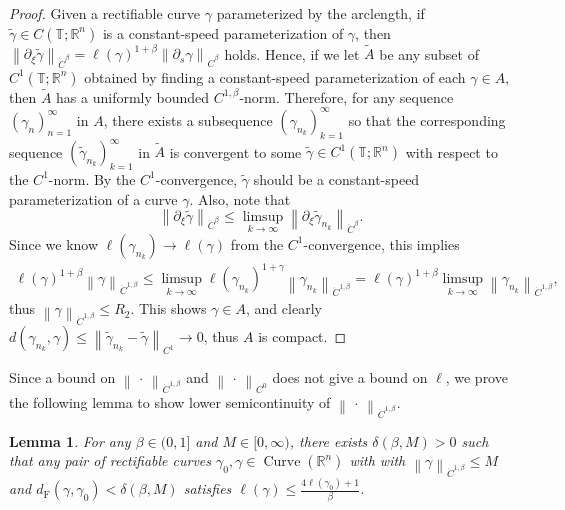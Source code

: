 \documentclass[reqno,centertags,12pt]{amsart}
\newtheorem{lemma}[theorem]{Lemma}
\theoremstyle{definition}
\numberwithin{equation}{section}
\newcommand{\norm}[1]{\left\|#1\right\|}
\newcommand{\seq}[1]{\left( #1 \right)}
\newcommand{\bbR}{{\mathbb{R}}}
\newcommand{\bbT}{{\mathbb{T}}}
\begin{document}
\begin{proof}
    Given a rectifiable curve $\gamma$ parameterized by the arclength,
    if $\tilde{\gamma}\in C(\bbT;\bbR^{n})$ is a constant-speed parameterization of $\gamma$,
    then $\norm{\partial_{\xi}\tilde{\gamma}}_{\dot{C}^{\beta}}
    = \ell(\gamma)^{1+\beta}\norm{\partial_{s}\gamma}_{\dot{C}^{\beta}}$ holds.
    Hence, if we let $\tilde{A}$ be any subset of $C^{1}(\bbT;\bbR^{n})$
    obtained by finding a constant-speed parameterization of each
    $\gamma\in A$, then $\tilde{A}$ has a uniformly bounded
    $C^{1,\beta}$-norm. Therefore, for any sequence
    $\seq{\gamma_{n}}_{n=1}^{\infty}$ in $A$, there exists a subsequence
    $\seq{\gamma_{n_{k}}}_{k=1}^{\infty}$ so that the corresponding sequence
    $\seq{\tilde{\gamma}_{n_{k}}}_{k=1}^{\infty}$ in $\tilde{A}$ is convergent
    to some $\tilde{\gamma}\in C^{1}(\bbT;\bbR^{n})$ with respect to the $C^{1}$-norm.
    By the $C^{1}$-convergence, $\tilde{\gamma}$ should be a constant-speed parameterization
    of a curve $\gamma$. Also, note that
    \[
        \norm{\partial_{\xi}\tilde{\gamma}}_{\dot{C}^{\beta}}
        \leq \limsup_{k\to\infty}\norm{\partial_{\xi}\tilde{\gamma}_{n_{k}}}_{\dot{C}^{\beta}}.
    \]
    Since we know $\ell(\gamma_{n_{k}}) \to \ell(\gamma)$ from the $C^{1}$-convergence,
    this implies
    \begin{align*}
        \ell(\gamma)^{1+\beta}\norm{\gamma}_{\dot{C}^{1,\beta}}
        \leq \limsup_{k\to\infty}\ell(\gamma_{n_{k}})^{1+\gamma}
        \norm{\gamma_{n_{k}}}_{\dot{C}^{1,\beta}}
        = \ell(\gamma)^{1+\beta}
        \limsup_{k\to\infty}\norm{\gamma_{n_{k}}}_{\dot{C}^{1,\beta}},
    \end{align*}
    thus $\norm{\gamma}_{\dot{C}^{1,\beta}} \leq R_{2}$.
    This shows $\gamma\in A$, and clearly $d(\gamma_{n_{k}},\gamma)
    \leq \norm{\tilde{\gamma}_{n_{k}} - \tilde{\gamma}}_{C^{1}} \to 0$,
    thus $A$ is compact.
\end{proof}

Since a bound on $\norm{\,\cdot\,}_{\dot{C}^{1,\beta}}$ and $\norm{\,\cdot\,}_{C^{0}}$
does not give a bound on $\ell$, we prove the following lemma to show
lower semicontinuity of $\norm{\,\cdot\,}_{\dot{C}^{1,\beta}}$.

\begin{lemma}\label{LB.6}
    For any $\beta\in(0,1]$ and $M\in[0,\infty)$, there exists
    $\delta(\beta,M)>0$ such that any pair of rectifiable curves
    $\gamma_{0},\gamma\in\operatorname{Curve}(\bbR^{n})$ with
    with $\norm{\gamma}_{\dot{C}^{1,\beta}} \leq M$ and
    $d_{\mathrm{F}}(\gamma,\gamma_{0}) < \delta(\beta,M)$ satisfies
    $\ell(\gamma) \leq \frac{4\ell(\gamma_{0}) + 1}{\beta}$.
\end{lemma}
\end{document}
